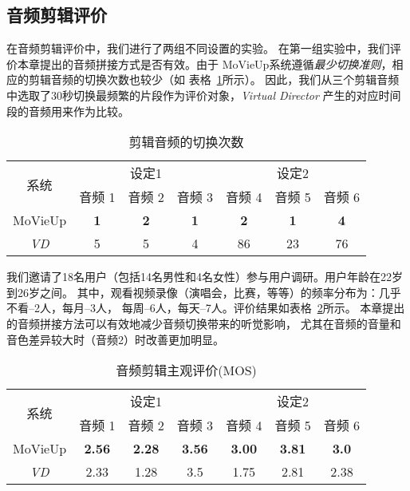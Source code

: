 \subsection{音频剪辑评价}
在音频剪辑评价中，我们进行了两组不同设置的实验。
在第一组实验中，我们评价本章提出的音频拼接方式是否有效。由于
MoVieUp系统遵循\emph{最少切换准则}，相应的剪辑音频的切换次数也较少（如
表格~\ref{tab:mashup-audio-switch-times}所示）。
因此，我们从三个剪辑音频中选取了30秒切换最频繁的片段作为评价对象，\emph{Virtual Director}
产生的对应时间段的音频用来作为比较。
\begin{table}[htpb]
    \centering
	\caption{剪辑音频的切换次数}
	\label{tab:mashup-audio-switch-times}
	\begin{tabular}{|c|c|c|c|c|c|c|}
		\hline
		\multirow{2}{*}{系统} & \multicolumn{3}{c|}{设定1} &
		\multicolumn{3}{c|}{设定2}\\
		\cline{2-7}
		& 音频 1& 音频 2 & 音频 3 & 音频 4 & 音频 5 & 音频 6 \\
		\hline
		MoVieUp &\textbf{1} &\textbf{2} & \textbf{1} & \textbf{2} & \textbf{1}& \textbf{4} \\
		\emph{VD} &5 & 5 & 4 & 86 & 23 & 76 \\
		\hline
	\end{tabular}
\end{table}

我们邀请了18名用户（包括14名男性和4名女性）参与用户调研。用户年龄在22岁到26岁之间。
其中，观看视频录像（演唱会，比赛，等等）的频率分布为：几乎不看--2人，每月--3人，
 每周--6人，每天--7人。评价结果如表格~\ref{tab:mashup-audio-eval}所示。
 本章提出的音频拼接方法可以有效地减少音频切换带来的听觉影响，
 尤其在音频的音量和音色差异较大时（音频2）时改善更加明显。
\begin{table}[htpb]
	\centering
    \caption{音频剪辑主观评价(MOS)}
	\label{tab:mashup-audio-eval}
	\begin{tabular}{|c|c|c|c|c|c|c|}
		\hline
		\multirow{2}{*}{系统} & \multicolumn{3}{c|}{设定1} &
		\multicolumn{3}{c|}{设定2}\\
		\cline{2-7}
		& 音频 1& 音频 2 & 音频 3 & 音频 4 & 音频 5 & 音频 6 \\
		\hline
		MoVieUp &\textbf{2.56} &\textbf{2.28} & \textbf{3.56} & \textbf{3.00} & \textbf{3.81}& \textbf{3.0} \\
		\emph{VD} &2.33 & 1.28 & 3.5 & 1.75 & 2.81 & 2.38 \\
		\hline
	\end{tabular}
\end{table}

